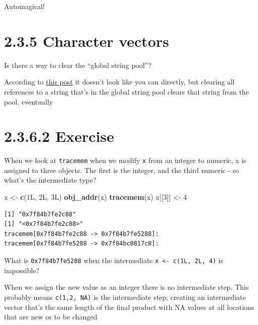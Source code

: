 \documentclass[]{book}
\newenvironment{Shaded}{\begin{snugshade}}{\end{snugshade}}
\newcommand{\DecValTok}[1]{\textcolor[rgb]{0.00,0.00,0.81}{#1}}
\newcommand{\KeywordTok}[1]{\textcolor[rgb]{0.13,0.29,0.53}{\textbf{#1}}}
\newcommand{\NormalTok}[1]{#1}
\newcommand{\StringTok}[1]{\textcolor[rgb]{0.31,0.60,0.02}{#1}}
\begin{document}
Automagical!

\hypertarget{character-vectors}{%
\section*{2.3.5 Character vectors}\label{character-vectors}}

Is there a way to clear the ``global string pool''?

According to \href{https://community.rstudio.com/t/memory-usage-and-rs-global-string-pool/4762/3}{this post} it doesn't look like you can directly, but clearing all references to a string that's in the global string pool clears that string from the pool, eventually

\hypertarget{exercise}{%
\section*{2.3.6.2 Exercise}\label{exercise}}

When we look at \texttt{tracemem} when we modify \texttt{x} from an integer to numeric, x is assigned to three objects. The first is the integer, and the third numeric - so what's the intermediate type?

\begin{Shaded}
\begin{Highlighting}[]
\NormalTok{x <-}\StringTok{ }\KeywordTok{c}\NormalTok{(1L, 2L, 3L)}
\KeywordTok{obj_addr}\NormalTok{(x)}
\KeywordTok{tracemem}\NormalTok{(x)}
\NormalTok{x[[}\DecValTok{3}\NormalTok{]] <-}\StringTok{ }\DecValTok{4}
\end{Highlighting}
\end{Shaded}

\begin{verbatim}
[1] "0x7f84b7fe2c88"
[1] "<0x7f84b7fe2c88>"
tracemem[0x7f84b7fe2c88 -> 0x7f84b7fe5288]: 
tracemem[0x7f84b7fe5288 -> 0x7f84bc0817c8]: 
\end{verbatim}

What is \texttt{0x7f84b7fe5288} when the intermediate \texttt{x\ \textless{}-\ c(1L,\ 2L,\ 4)} is impossible?

When we assign the new value as an integer there is no intermediate step. This probably means \texttt{c(1,2,\ NA)} is the intermediate step; creating an intermediate vector that's the same length of the final product with NA values at all locations that are new or to be changed
\end{document}
